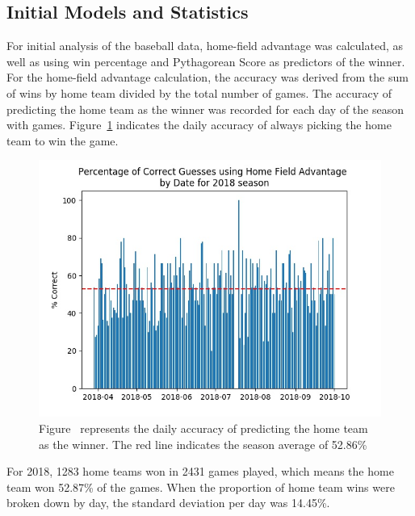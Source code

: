\documentclass{article}
\begin{document}
\subsection{Initial Models and Statistics}
For initial analysis of the baseball data,
home-field advantage was calculated,
as well as using win percentage and Pythagorean Score as predictors of the
winner.
For the home-field advantage calculation,
the accuracy was derived from the sum of wins by home team divided by the 
total number of games.
The accuracy of predicting the home team as the winner was recorded for each 
day of the season with games.
Figure~\ref{Fig:Home-Field} indicates the daily accuracy of always picking the 
home team to win the game.
\begin{figure}[ht]
    \centering
    \includegraphics[width=.8\textwidth]{home-correctness.jpg}
    \caption{Figure~\label{Fig:Home-Field} represents the daily accuracy of 
    predicting the home team as the winner.  The red line indicates the season
average of 52.86\%}
\end{figure}
For 2018,
1283 home teams won in 2431 games played,
which means the home team won 52.87\% of the games.
When the proportion of home team wins were broken down by day,
the standard deviation per day was 14.45\%.\par
\end{document}
